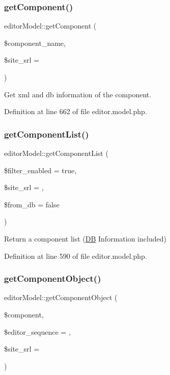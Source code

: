 \subsubsection{\texorpdfstring{get\+Component()}{getComponent()}}
{\footnotesize\ttfamily editor\+Model\+::get\+Component (\begin{DoxyParamCaption}\item[{}]{\$component\+\_\+name,  }\item[{}]{\$site\+\_\+srl = {} }\end{DoxyParamCaption})}



Get xml and db information of the component. 



Definition at line 662 of file editor.\+model.\+php.

\mbox{\label{classeditorModel_a24cf5d2f9bc9783dd2efd85fb0f89408}} 
\subsubsection{\texorpdfstring{get\+Component\+List()}{getComponentList()}}
{\footnotesize\ttfamily editor\+Model\+::get\+Component\+List (\begin{DoxyParamCaption}\item[{}]{\$filter\+\_\+enabled = {\ttfamily true},  }\item[{}]{\$site\+\_\+srl = {},  }\item[{}]{\$from\+\_\+db = {\ttfamily false} }\end{DoxyParamCaption})}



Return a component list (\hyperlink{classDB}{DB} Information included) 



Definition at line 590 of file editor.\+model.\+php.

\mbox{\label{classeditorModel_aef219fecfb7dcd9343cc9028930eaccd}} 
\subsubsection{\texorpdfstring{get\+Component\+Object()}{getComponentObject()}}
{\footnotesize\ttfamily editor\+Model\+::get\+Component\+Object (\begin{DoxyParamCaption}\item[{}]{\$component,  }\item[{}]{\$editor\+\_\+sequence = {},  }\item[{}]{\$site\+\_\+srl = {} }\end{DoxyParamCaption})}



